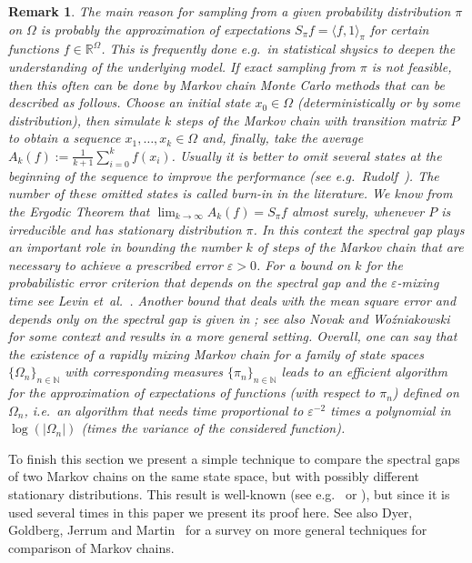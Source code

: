 \documentclass{dis}
\newtheorem{remark}[theorem]{Remark}
\theoremstyle{citing}
\begin{document}
\vspace{3mm}
\begin{remark}
The main reason for sampling from 
a given probability distribution $\pi$ on ${\Omega}$ is 
probably the approximation of expectations 
$S_\pi f = {\langle} f,1{\rangle}_\pi$ for certain functions $f\in{\ensuremath{\mathbb{R}}}^{\Omega}$. 
This is frequently done e.g.~in statistical shysics to 
deepen the understanding of the underlying model.
If exact sampling from $\pi$ is not feasible, then this often can be 
done by \emph{Markov chain Monte Carlo methods} that can be 
described as follows. Choose an initial state $x_0\in{\Omega}$ 
(deterministically or by some distribution), then simulate 
$k$ steps of the Markov chain with transition matrix $P$ 
to obtain a sequence $x_1,\dots,x_{k}\in{\Omega}$ and, finally, 
take the average $A_k(f):=\frac{1}{k+1}\sum_{i=0}^{k} f(x_i)$. 
Usually it is better to omit several states at the beginning of the 
sequence to improve the performance 
(see e.g.~Rudolf~\cite{Rud-diss}). The number of these omitted 
states is called \emph{burn-in} in the literature.
We know from the \emph{Ergodic Theorem} \cite[Thm.~4.16]{LPW} 
that $\lim_{k\to\infty}A_k(f)=S_\pi f$ almost surely, whenever 
$P$ is irreducible and has stationary distribution $\pi$. 
In this context the spectral gap plays an important role in 
bounding the number $k$ of steps of the Markov chain that are necessary 
to achieve a prescribed error ${\varepsilon}>0$. 
For a bound on $k$ for the probabilistic error criterion that 
depends on the spectral gap and the ${\varepsilon}$-mixing time see 
Levin et~al.~\cite[Sec.~12.6]{LPW}. 
Another bound that deals with the mean square error and 
depends only on the spectral gap is given in \cite{Rud09,Rud10};  
see also Novak and Wo{\'z}niakowski~\cite{NW2} for some 
context and results in a more general setting. 
Overall, one can say that the existence of a rapidly mixing 
Markov chain for a family of state spaces $\{{\Omega}_n\}_{n\in{\ensuremath{\mathbb{N}}}}$ 
with corresponding measures $\{\pi_n\}_{n\in{\ensuremath{\mathbb{N}}}}$ 
leads to an efficient algorithm for the approximation of 
expectations of functions (with respect to $\pi_n$) defined on ${\Omega}_n$, 
i.e.~an algorithm that needs time proportional to ${\varepsilon}^{-2}$ 
times a polynomial in $\log(|{\Omega}_n|)$ (times the variance of the 
considered function).
\end{remark}
\vspace{3mm}

To finish this section we present a simple technique to compare 
the spectral gaps of two Markov chains on the same state space, 
but with possibly different stationary distributions. 
This result is well-known (see e.g.~\cite{DSC2} or \cite{LPW}), 
but since it is used several times in this paper
we present its proof here. 
See also Dyer, Goldberg, Jerrum and Martin~\cite{DGJM} 
for a survey on more general techniques for comparison of Markov chains.
\end{document}
